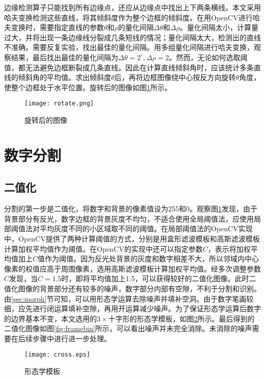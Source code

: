 边缘检测算子只能找到所有边缘点，还应从边缘点中找出上下两条横线。本文采用哈夫变换检测这些直线，将其倾斜度作为整个边框的倾斜度。在用OpenCV进行哈夫变换时，需要指定直线的参数$\theta$和$\rho$的量化间隔$\Delta\theta$和$\Delta\rho$。量化间隔太小，计算量过大，并将出现一条边缘线分裂成几条短线的情况；量化间隔太大，检测出的直线不准确。需要反复实验，找出最佳的量化间隔。用多组量化间隔进行哈夫变换，观察结果，最后找出最佳的量化间隔为$\Delta\theta=2^\circ,\Delta\rho=2$。然而，无论如何选取阈值，都无法避免边框断裂成几条直线。因此在计算直线倾斜角时，应该统计多条直线的倾斜角的平均值。求出倾斜度$\theta$后，再将边框图像绕中心按反方向旋转$\theta$角度，使整个边框处于水平位置。旋转后的图像如图\ref{fig:rotate}所示。
\begin{figure}[h]
  \centering
  \texttt{[image: rotate.png]}
  \caption{旋转后的图像}
  \label{fig:rotate}
\end{figure}

\section{数字分割}


\subsection{二值化}


分割的第一步是二值化，将数字和背景的像素值设为255和0。观察图\ref{fig:rotate}发现，由于背景部分有反光，数字边框的背景灰度不均匀，不适合使用全局阈值法，应使用局部阈值法对平均灰度不同的小区域取不同的阈值。在局部阈值法的OpenCV实现中，OpenCV提供了两种计算阈值的方式，分别是用盒形滤波模板和高斯滤波模板计算加权平均值作为阈值。在OpenCV的实现中还可以指定参数$C$，表示将加权平均值加上$C$值作为阈值。因为反光处背景的灰度和数字相差不大，所以邻域内中心像素的权值应高于周围像素，选用高斯滤波模板计算加权平均值。经多次调整参数$C$发现，当$C=1.5$时，即将平均值加上1.5，可以获得较好的二值化图像。此时二值化图像的背景部分还有较多的噪声，数字部分内部有空隙，不利于分割和识别。由\ref{sec:morph}节可知，可以用形态学运算去除噪声并填补空洞。由于数字笔画较细，应先进行闭运算填补空隙，再用开运算减少噪声。为了保证形态学运算后数字的边界基本不变，本文选用的$3\times $十字形的形态学模板，如图\ref{fig:morph}所示。最后得到的二值化图像如图\ref{fig:framebin}所示，可以看出噪声并未完全消除。未消除的噪声需要在后续步骤中进行进一步处理。
\begin{figure}[h]
  \centering
  \texttt{[image: cross.eps]}
  \caption{形态学模板}
  \label{fig:morph}
\end{figure}

